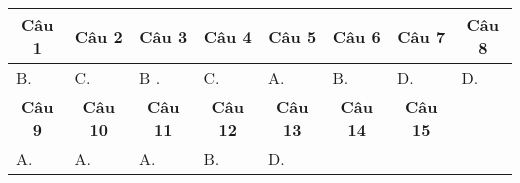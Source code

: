 \begin{longtable}[\textwidth]{|p{}|p{}|p{}|p{}|p{}|p{}|p{}|p{}|}
	\hline%
	\multicolumn{1}{|c}{\textbf{Câu 1}} & \multicolumn{1}{|c|}{\textbf{Câu 2}} & \multicolumn{1}{c|}{\textbf{Câu 3}} &
	\multicolumn{1}{c|}{\textbf{Câu 4}} &
	\multicolumn{1}{c|}{\textbf{Câu 5}} &
	\multicolumn{1}{c|}{\textbf{Câu 6}} &
	\multicolumn{1}{c|}{\textbf{Câu 7}} &
	\multicolumn{1}{c|}{\textbf{Câu 8}} \\
	\hline
	B.&C. &B . &C. &A. &B. &D. &D.	\\
	\hline
	
	\multicolumn{1}{|c|}{\textbf{Câu 9}} & \multicolumn{1}{c|}{\textbf{Câu 10}} & \multicolumn{1}{c|}{\textbf{Câu 11}} &
	\multicolumn{1}{c|}{\textbf{Câu 12}} &
	\multicolumn{1}{c|}{\textbf{Câu 13}} &
	\multicolumn{1}{c|}{\textbf{Câu 14}} &
	\multicolumn{1}{c|}{\textbf{Câu 15}} &
	\multicolumn{1}{c|}{}  \\
	\hline
	A. &A. &A. &B. &D. &&&	\\
	\hline
\end{longtable}

